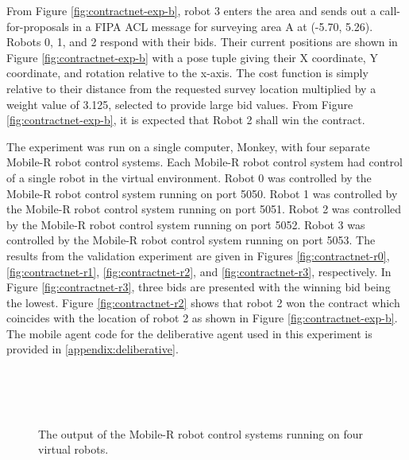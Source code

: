     From Figure \ref{fig:contractnet-exp-b}, robot 3 enters the area and sends 
      out a call-for-proposals in a FIPA ACL message for surveying area A at 
      (-5.70, 5.26).
    Robots 0, 1, and 2 respond with their bids.
    Their current positions are shown in Figure \ref{fig:contractnet-exp-b}
      with a pose tuple giving their X coordinate, Y coordinate, and rotation
      relative to the x-axis.
    The cost function is simply relative to their distance from the requested
      survey location multiplied by a weight value of 3.125, selected to 
      provide large bid values.
    From Figure \ref{fig:contractnet-exp-b}, it is expected that Robot 2 shall
      win the contract.

    The experiment was run on a single computer, Monkey, with four separate
      Mobile-R robot control systems.
    Each Mobile-R robot control system had control of a single robot in the virtual
      environment.
    Robot 0 was controlled by the Mobile-R robot control system running on port
      5050.
    Robot 1 was controlled by the Mobile-R robot control system running on port
      5051.
    Robot 2 was controlled by the Mobile-R robot control system running on port
      5052.
    Robot 3 was controlled by the Mobile-R robot control system running on port
      5053.
    The results from the validation experiment are given in Figures
      \ref{fig:contractnet-r0}, \ref{fig:contractnet-r1}, 
      \ref{fig:contractnet-r2}, and \ref{fig:contractnet-r3}, respectively.
    In Figure \ref{fig:contractnet-r3}, three bids are presented with the 
      winning bid being the lowest.
    Figure \ref{fig:contractnet-r2} shows that robot 2 won the contract
      which coincides with the location of robot 2 as shown in Figure
      \ref{fig:contractnet-exp-b}.
    The mobile agent code for the deliberative agent used in this experiment
      is provided in \ref{appendix:deliberative}.
    \begin{figure}%
      \begin{center}
       \\
      \\
      \\
      \end{center}
      \caption{The output of the Mobile-R robot control systems running on four 
               virtual robots.}
      \label{fig:contractnet-results}
    \end{figure}

